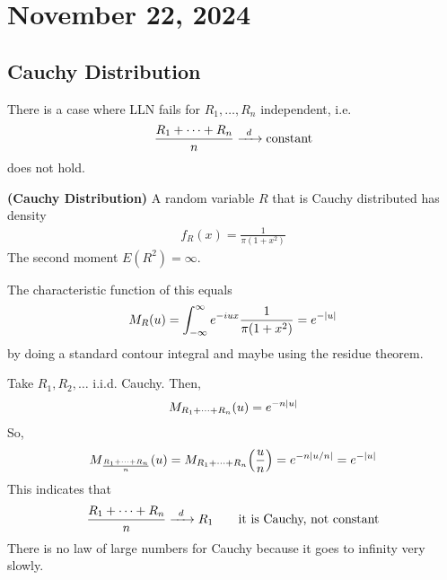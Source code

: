 \section{November 22, 2024}

\subsection{Cauchy Distribution}
There is a case where LLN fails for $R_1, \ldots, R_n$ independent, i.e.
\begin{align}
    \frac{R_1 + \cdots + R_n}{n} \ce{->[$d$]} \text{constant}
\end{align}
does not hold.

\begin{definition}
    \textbf{(Cauchy Distribution)} A random variable $R$ that is Cauchy distributed has density
    \begin{align}
        f_R(x) = \frac{1}{\pi(1+x^2)}
    \end{align}
    The second moment $E(R^2) = \infty$.
\end{definition}

The characteristic function of this equals
\begin{align}
    M_R(u) = \int_{-\infty}^\infty e^{-iux} \frac{1}{\pi(1 + x^2)} = e^{-\abs{u}}
\end{align}
by doing a standard contour integral and maybe using the residue theorem.

\begin{example}
    Take $R_1, R_2, \ldots$ i.i.d. Cauchy. Then,
    \begin{align}
        M_{R_1 + \cdots + R_n}(u) = e^{-n\abs{u}}
    \end{align}
    So,
    \begin{align}
        M_{\frac{R_1 + \cdots + R_n}{n}}(u) = M_{R_1 + \cdots + R_n}\qty(\frac{u}{n}) = e^{-n\abs{u/n}} = e^{-\abs{u}}
    \end{align}
    This indicates that
    \begin{align}
        \frac{R_1 + \cdots + R_n}{n} \ce{->[$d$]} R_1 \qsp \text{it is Cauchy, not constant}
    \end{align}
    There is no law of large numbers for Cauchy because it goes to infinity very slowly.
\end{example}

